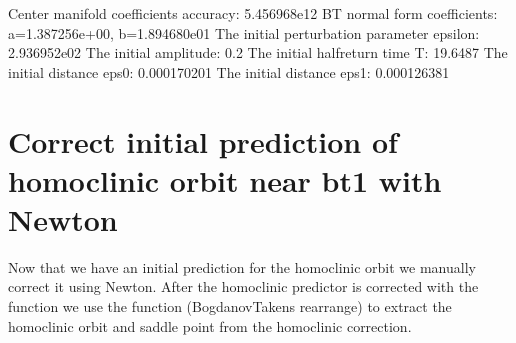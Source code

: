 \documentclass[letterpaper,10pt,english]{jupyterBook}
\begin{document}
\begin{sphinxVerbatim}[commandchars=\\\{\}]
\PYG{p}{[}\PYG{p}{]}
\end{sphinxVerbatim}

\begin{sphinxVerbatim}[commandchars=\\\{\}]
Center manifold coefficients\PYGZsq{} accuracy: 5.456968e\PYGZhy{}12
BT normal form coefficients:
a=1.387256e+00,	 b=\PYGZhy{}1.894680e\PYGZhy{}01
The initial perturbation parameter epsilon:  2.936952e\PYGZhy{}02
The initial amplitude: 0.2
The initial half\PYGZhy{}return time T: 19.6487
The initial distance eps0: 0.000170201
The initial distance eps1: 0.000126381
\end{sphinxVerbatim}


\section{Correct initial prediction of homoclinic orbit near bt1 with Newton}
\label{\detokenize{HomoclinicRGflows:correct-initial-prediction-of-homoclinic-orbit-near-bt1-with-newton}}
\sphinxAtStartPar
Now that we have an initial prediction for the homoclinic orbit we
manually correct it using Newton. After the homoclinic predictor is corrected
with the  function  we use the function 
(Bogdanov\sphinxhyphen{}Takens rearrange) to extract the homoclinic orbit and saddle point
from the homoclinic correction.
\end{document}
